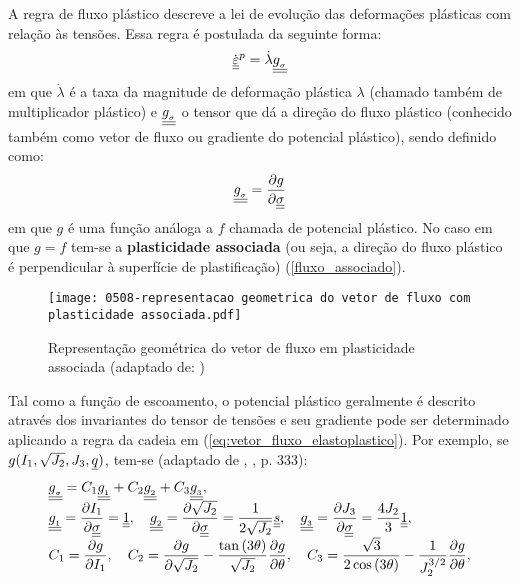 A regra de fluxo plástico descreve a lei de evolução das deformações plásticas com relação às tensões. Essa regra é postulada da seguinte forma:
\begin{equation}
	\label{eq:fluxo_elastoplastico}
	\dot {\underline{\underline \varepsilon}}^p = \dot \lambda \underline{\underline {g_{_\sigma}}}
\end{equation}
em que $\dot \lambda$ é a taxa da magnitude de deformação plástica $\lambda$ (chamado também de multiplicador plástico) e $\underline{\underline {g_{_\sigma}}}$ o tensor que dá a direção do fluxo plástico (conhecido também como vetor de fluxo ou gradiente do potencial plástico), sendo definido como:
\begin{equation}
	\label{eq:vetor_fluxo_elastoplastico}
	\underline{\underline {g_{_\sigma}}} = \dfrac{\partial g}{\partial \underline{\underline \sigma}}
\end{equation}
em que $g$ é uma função análoga a $f$ chamada de potencial plástico. No caso em que $g=f$ tem-se a \textbf{plasticidade associada} (ou seja, a direção do fluxo plástico é perpendicular à superfície de plastificação) (\autoref{fluxo_associado}).
\begin{figure}[H]
	\begin{center}
		\texttt{[image: 0508-representacao geometrica do vetor de fluxo com plasticidade associada.pdf]}
	\end{center}
	\caption{\label{fluxo_associado}Representação geométrica do vetor de fluxo em plasticidade associada (adaptado de: )}
\end{figure}
Tal como a função de escoamento, o potencial plástico geralmente é descrito através dos invariantes do tensor de tensões e seu gradiente pode ser determinado aplicando a regra da cadeia em (\ref{eq:vetor_fluxo_elastoplastico}). Por exemplo, se $g(I_1,\sqrt{J_2},J_3,\underline q)$, tem-se (adaptado de \citeauthor{Viladkar1995}, \citeyear{Viladkar1995}, p. 333):
\begin{equation}
	\label{eq:invariantes_tensores}
	\begin{array}{lcl}
		\underline{\underline {g_{_\sigma}}} = C_1\underline{\underline {g_{_1}}} + C_2\underline{\underline {g_{_2}}} + C_3\underline{\underline {g_{_3}}}, \\ 
		\underline{\underline {g_{_1}}} = \dfrac{\partial I_1}{\partial \underline{\underline \sigma}} = \underline{\underline 1},~~~ \underline{\underline {g_{_2}}} = \dfrac{\partial \sqrt{J_2}}{\partial \underline{\underline \sigma}} = \dfrac{1}{2\sqrt{J_2}}\underline{\underline s},~~~ \underline{\underline {g_{_3}}} = \dfrac{\partial J_3}{\partial \underline{\underline \sigma}} = \dfrac{4J_2}{3}\underline{\underline 1}, \\
		C_1 = \dfrac{\partial g}{\partial I_1},~~~C_2=\dfrac{\partial g}{\partial \sqrt{J_2}}-\dfrac{\tan{(3\theta)}}{\sqrt{J_2}}\dfrac{\partial g}{\partial \theta},~~~C_3 = \dfrac{\sqrt{3}}{2\cos{(3\theta})}-\dfrac{1}{J_2^{3/2}}\dfrac{\partial g}{\partial \theta},
	\end{array}
\end{equation}
